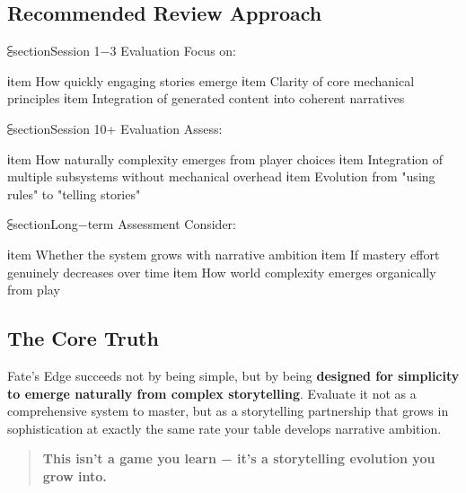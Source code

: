 \subsection{Recommended Review Approach}

⫕section{Session 1−3 Evaluation}
Focus on:
\begin{itemize}
    ℹtem How quickly engaging stories emerge
    ℹtem Clarity of core mechanical principles
    ℹtem Integration of generated content into coherent narratives
\end{itemize}

⫕section{Session 10+ Evaluation}  
Assess:
\begin{itemize}
    ℹtem How naturally complexity emerges from player choices
    ℹtem Integration of multiple subsystems without mechanical overhead
    ℹtem Evolution from "using rules" to "telling stories"
\end{itemize}

⫕section{Long−term Assessment}
Consider:
\begin{itemize}
    ℹtem Whether the system grows with narrative ambition
    ℹtem If mastery effort genuinely decreases over time
    ℹtem How world complexity emerges organically from play
\end{itemize}

\subsection{The Core Truth}

Fate's Edge succeeds not by being simple, but by being \textbf{designed for simplicity to emerge naturally from complex storytelling}. Evaluate it not as a comprehensive system to master, but as a storytelling partnership that grows in sophistication at exactly the same rate your table develops narrative ambition.

\begin{quote}
\textbf{This isn't a game you learn − it's a storytelling evolution you grow into.}
\end{quote}
